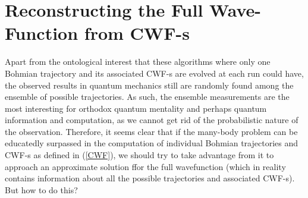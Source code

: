 \documentclass[11pt, a4paper]{article} %
\begin{document}
\newpage
\section{Reconstructing the Full Wave-Function from CWF-s}
Apart from the ontological interest that these algorithms where only one Bohmian trajectory and its associated CWF-s are evolved at each run could have, the observed results in quantum mechanics still are randomly found among the ensemble of possible trajectories. As such, the ensemble measurements are the most interesting for orthodox quantum mentality and perhaps quantum information and computation, as we cannot get rid of the probabilistic nature of the observation. Therefore, it seems clear that if the many-body problem can be educatedly surpassed in the computation of individual Bohmian trajectories and CWF-s as defined in (\ref{CWF}), we should try to take advantage from it to approach an approximate solution ffor the full wavefunction (which in reality contains information about all the possible trajectories and associated CWF-s). But how to do this?
\end{document}
